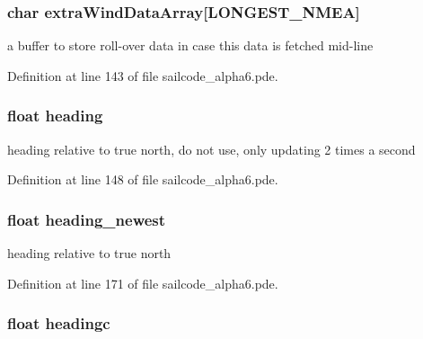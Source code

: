 \hypertarget{group__group1_ga5a0e345949d7a23900298d33d0be150c}{
\subsubsection[{extra\-Wind\-Data\-Array}]{\setlength{\rightskip}{0pt plus 5cm}char {\bf extra\-Wind\-Data\-Array}\mbox{[}\-L\-O\-N\-G\-E\-S\-T\-\_\-\-N\-M\-E\-A\mbox{]}}}
\label{group__group1_ga5a0e345949d7a23900298d33d0be150c}


a buffer to store roll-\/over data in case this data is fetched mid-\/line 



\-Definition at line 143 of file sailcode\-\_\-alpha6.\-pde.

\hypertarget{group__group1_gac5682e48513a771560df50e3b213e61a}{
\subsubsection[{heading}]{\setlength{\rightskip}{0pt plus 5cm}float {\bf heading}}}
\label{group__group1_gac5682e48513a771560df50e3b213e61a}


heading relative to true north, do not use, only updating 2 times a second 



\-Definition at line 148 of file sailcode\-\_\-alpha6.\-pde.

\hypertarget{group__group1_ga3c596663ba52aec96df1f504772914be}{
\subsubsection[{heading\-\_\-newest}]{\setlength{\rightskip}{0pt plus 5cm}float {\bf heading\-\_\-newest}}}
\label{group__group1_ga3c596663ba52aec96df1f504772914be}


heading relative to true north 



\-Definition at line 171 of file sailcode\-\_\-alpha6.\-pde.

\hypertarget{group__group1_ga4736792191ccbbbb7b3d6933a3302336}{
\subsubsection[{headingc}]{\setlength{\rightskip}{0pt plus 5cm}float {\bf headingc}}}
\label{group__group1_ga4736792191ccbbbb7b3d6933a3302336}


